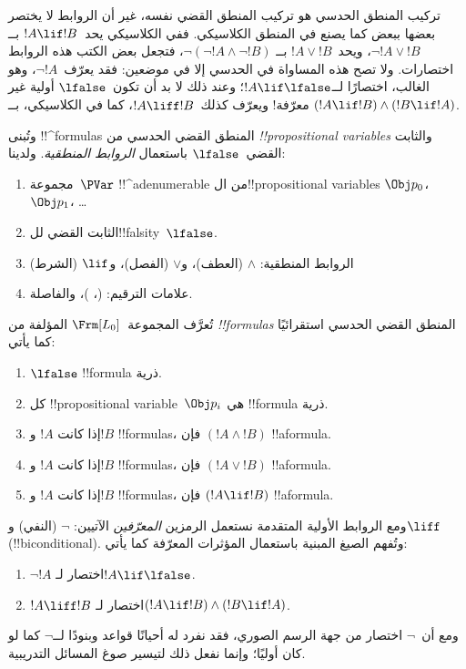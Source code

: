 \documentclass[../../../include/open-logic-section]{subfiles}
\begin{document}


تركيب المنطق الحدسي هو تركيب المنطق القضي نفسه، غير أن الروابط لا يختصر
بعضها ببعض كما يصنع في المنطق الكلاسيكي. ففي الكلاسيكي يحد~$!A \lif !B$
بــ$\lnot !A \lor !B$، ويحد~$!A \lor !B$ بــ
$\lnot(\lnot !A \land \lnot !B)$، فتجعل بعض الكتب هذه الروابط اختصارات.
ولا تصح هذه المساواة في الحدسي إلا في موضعين: فقد يعرّف~$\lnot !A$، وهو
الغالب، اختصارًا لــ$!A \lif \lfalse$؛ وعند ذلك لا بد أن تكون~$\lfalse$
أولية غير معرّفة!{} ويعرّف كذلك~$!A \liff !B$، كما في الكلاسيكي، بــ
$(!A \lif !B) \land (!B \lif !A)$.

وتُبنى !!^{formula}s المنطق القضي الحدسي من
\emph{!!{propositional variable}s} والثابت القضي~$\lfalse$ باستعمال
\emph{الروابط المنطقية}. ولدينا:

\begin{enumerate}
\item مجموعة~$\PVar$ !!^a{denumerable} من ال!!{propositional variable}s
  $\Obj p_0$، $\Obj p_1$، \dots
  \item الثابت القضي لل!!{falsity}~$\lfalse$.
\item الروابط المنطقية: $\land$
  (العطف)، و$\lor$ (الفصل)، و$\lif$ (الشرط)
\item علامات الترقيم: (، )، والفاصلة.
\end{enumerate}

\begin{defn}[الصيغة]
 تُعرَّف المجموعة~$\Frm[L_0]$ المؤلفة من
\emph{!!{formula}s} المنطق القضي الحدسي استقرائيًا كما يأتي:
\begin{enumerate}
\item $\lfalse$ !!{formula} ذرية.

\item كل !!{propositional variable}~$\Obj p_i$ هي !!{formula} ذرية.

\item إذا كانت $!A$ و$!B$ !!{formula}s، فإن $(!A \land
  !B)$ !!a{formula}.

\item إذا كانت $!A$ و$!B$ !!{formula}s، فإن $(!A \lor !B)$
  !!a{formula}.

\item إذا كانت $!A$ و$!B$ !!{formula}s، فإن $(!A \lif !B)$
  !!a{formula}.

\end{enumerate}
\end{defn}

ومع الروابط الأولية المتقدمة نستعمل الرمزين
\emph{المعرّفين} الآتيين: $\lnot$ (النفي) و$\liff$
(!!{biconditional}). وتُفهم الصيغ المبنية باستعمال المؤثرات المعرّفة
كما يأتي:
\begin{enumerate}
\item $\lnot !A$ اختصار لـ$!A \lif \lfalse$.

\item $!A \liff !B$ اختصار لـ$(!A \lif !B) \land (!B
  \lif !A)$.
\end{enumerate}

ومع أن~$\lnot$ اختصار من جهة الرسم الصوري، فقد نفرد له أحيانًا قواعد
وبنودًا لــ$\lnot$ كما لو كان أوليًا؛ وإنما نفعل ذلك لتيسير صوغ المسائل
التدريبية.
\end{document}
